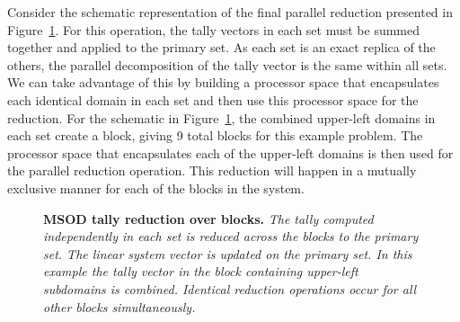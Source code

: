 Consider the schematic representation of the final parallel reduction
presented in Figure~\ref{fig:msod_tally_reduction}. For this
operation, the tally vectors in each set must be summed together and
applied to the primary set. As each set is an exact replica of the
others, the parallel decomposition of the tally vector is the same
within all sets. We can take advantage of this by building a processor
space that encapsulates each identical domain in each set and then use
this processor space for the reduction. For the schematic in
Figure~\ref{fig:msod_tally_reduction}, the combined upper-left domains
in each set create a block, giving 9 total blocks for this example
problem. The processor space that encapsulates each of the upper-left
domains is then used for the parallel reduction operation. This
reduction will happen in a mutually exclusive manner for each of the
blocks in the system.

\begin{figure}[t!]
  \begin{center}
    \scalebox{0.55}{  }
  \end{center}
  \caption{\textbf{MSOD tally reduction over blocks.} \textit{The
      tally computed independently in each set is reduced across the
      blocks to the primary set. The linear system vector is updated
      on the primary set. In this example the tally vector in the
      block containing upper-left subdomains is combined. Identical
      reduction operations occur for all other blocks
      simultaneously.}}
  \label{fig:msod_tally_reduction}
\end{figure}


